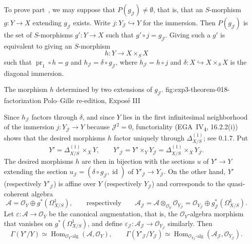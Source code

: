To prove part~, we may suppose that
\(P(g_{\mathscr J})\ne\emptyset\), that is, that an \(S\)-morphism
\(g:Y\to X\) extending \(g_{\mathscr J}\) exists. Write
\(j:Y_{\mathscr J}\hookrightarrow Y\) for the immersion. Then
\(P(g_{\mathscr J})\) is the set of \(S\)-morphisms \(g':Y\to X\)
such that \(g'\circ j=g_{\mathscr J}\). Giving such a \(g'\) is
equivalent to giving an \(S\)-morphism
\[
 h:Y\longrightarrow X\times_S X
\]
such that \(\operatorname{pr}_1\circ h=g\) and
\(h_{\mathscr J}=\delta\circ g_{\mathscr J}\), where
\(h_{\mathscr J}=h\circ j\) and
\(\delta:X\hookrightarrow X\times_S X\) is the diagonal immersion.

  {The morphism \(h\) determined by two extensions of \(g_{\mathscr J}\).}
  {fig:exp3-theorem-018-factorization}
  {Polo--Gille re-edition, Expos\'e III}

Since \(h_{\mathscr J}\) factors through \(\delta\), and since \(Y\)
lies in the first infinitesimal neighborhood of the immersion
\(j:Y_{\mathscr J}\to Y\) because \(\mathscr J^2=0\), functoriality
(EGA~IV\textsubscript{4}, 16.2.2(i)) shows that the desired morphisms
\(h\) factor uniquely through \(\Delta^{(1)}_{X/S}\); see 0.1.7. Put
\[
 Y'=\Delta^{(1)}_{X/S}\times_XY,
 \qquad
 Y'_{\mathscr J}=Y'\times_YY_{\mathscr J}
 =\Delta^{(1)}_{X/S}\times_XY_{\mathscr J}.
\]
The desired morphisms \(h\) are then in bijection with the sections
\(u\) of \(Y'\to Y\) extending the section
\(u_{\mathscr J}=(\delta\circ g_{\mathscr J},\operatorname{id})\) of
\(Y'_{\mathscr J}\to Y_{\mathscr J}\). On the other hand, \(Y'\)
(respectively \(Y'_{\mathscr J}\)) is affine over \(Y\)
(respectively \(Y_{\mathscr J}\)) and corresponds to the
quasi-coherent algebra
\[
 \mathscr A=\mathscr O_Y\oplus g^*(\Omega^1_{X/S}),
 \qquad\text{respectively}\qquad
 \mathscr A_{\mathscr J}
 =\mathscr A\otimes_{\mathscr O_Y}\mathscr O_{Y_{\mathscr J}}
 =\mathscr O_{Y_{\mathscr J}}
   \oplus g_{\mathscr J}^*(\Omega^1_{X/S}).
\]
Let \(\varepsilon:\mathscr A\to\mathscr O_Y\) be the canonical
augmentation, that is, the \(\mathscr O_Y\)-algebra morphism that
vanishes on \(g^*(\Omega^1_{X/S})\), and define
\(\varepsilon_{\mathscr J}:\mathscr A_{\mathscr J}
 \to\mathscr O_{Y_{\mathscr J}}\) similarly. Then
\[
 \Gamma(Y'/Y)
 \simeq\operatorname{Hom}_{\mathscr O_Y\text{-}\mathrm{alg}}
       (\mathscr A,\mathscr O_Y),
 \qquad
 \Gamma(Y'_{\mathscr J}/Y_{\mathscr J})
 \simeq
 \operatorname{Hom}_{\mathscr O_{Y_{\mathscr J}}\text{-}\mathrm{alg}}
       (\mathscr A_{\mathscr J},\mathscr O_{Y_{\mathscr J}}).
\]

